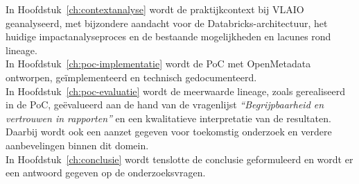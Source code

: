In Hoofdstuk~\ref{ch:contextanalyse} wordt de praktijkcontext bij VLAIO geanalyseerd, met bijzondere aandacht voor de Databricks-architectuur, het huidige impactanalyseproces en de bestaande mogelijkheden en lacunes rond lineage.\\

In Hoofdstuk~\ref{ch:poc-implementatie} wordt de PoC met OpenMetadata ontworpen, geïmplementeerd en technisch gedocumenteerd.\\

In Hoofdstuk~\ref{ch:poc-evaluatie} wordt de meerwaarde lineage, zoals gerealiseerd in de PoC, geëvalueerd aan de hand van de vragenlijst \emph{``Begrijpbaarheid en vertrouwen in rapporten''} en een kwalitatieve interpretatie van de resultaten. Daarbij wordt ook een aanzet gegeven voor toekomstig onderzoek en verdere aanbevelingen binnen dit domein.\\

In Hoofdstuk~\ref{ch:conclusie} wordt tenslotte de conclusie geformuleerd en wordt er een antwoord gegeven op de onderzoeksvragen.\\